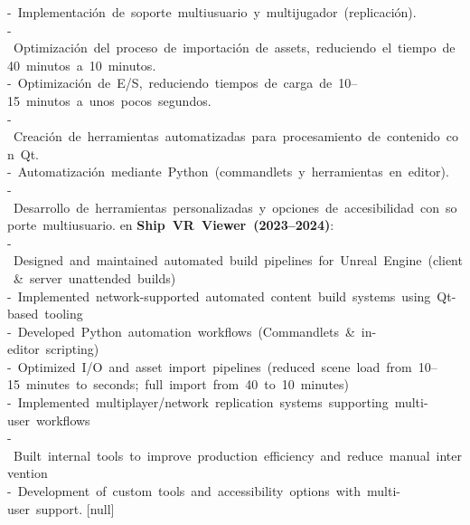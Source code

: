 {{{{				-~Implementación~de~soporte~multiusuario~y~multijugador~(replicación).\\
				-~Optimización~del~proceso~de~importación~de~assets,~reduciendo~el~tiempo~de~40~minutos~a~10~minutos.\\
				-~Optimización~de~E/S,~reduciendo~tiempos~de~carga~de~10--15~minutos~a~unos~pocos~segundos.\\
				-~Creación~de~herramientas~automatizadas~para~procesamiento~de~contenido~con~Qt.\\
				-~Automatización~mediante~Python~(commandlets~y~herramientas~en~editor).\\
				-~Desarrollo~de~herramientas~personalizadas~y~opciones~de~accesibilidad~con~soporte~multiusuario.
			}
			{en}
			{
				\textbf{Ship~VR~Viewer~(2023--2024)}:\\
						-~Designed~and~maintained~automated~build~pipelines~for~Unreal~Engine~(client~\&~server~unattended~builds)\\
						-~Implemented~network-supported~automated~content~build~systems~using~Qt-based~tooling\\
						-~Developed~Python~automation~workflows~(Commandlets~\&~in-editor~scripting)\\
						-~Optimized~I/O~and~asset~import~pipelines~(reduced~scene~load~from~10–15~minutes~to~seconds;~full~import~from~40~to~10~minutes)\\
						-~Implemented~multiplayer/network~replication~systems~supporting~multi-user~workflows\\
						-~Built~internal~tools~to~improve~production~efficiency~and~reduce~manual~intervention \\
						-~Development~of~custom~tools~and~accessibility~options~with~multi-user~support.
			}
		}{[null]}
	}
}

